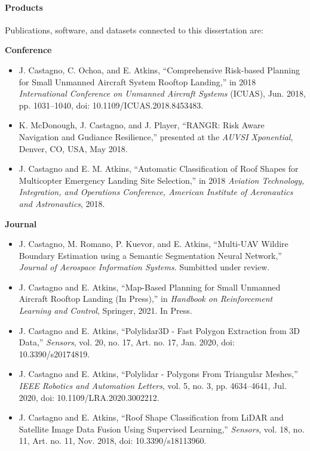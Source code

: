 

\paragraph{Products}
Publications, software, and datasets connected to this dissertation are:
\vspace{0.2cm}

\textbf{Conference}
\vspace{0.20cm}
\begin{itemize}[noitemsep]
    \item J. Castagno, C. Ochoa, and E. Atkins, ``Comprehensive Risk-based Planning for Small Unmanned Aircraft System Rooftop Landing,” in 2018 \emph{International Conference on Unmanned Aircraft Systems} (ICUAS), Jun. 2018, pp. 1031–1040, doi: 10.1109/ICUAS.2018.8453483.
    \item K. McDonough, J. Castagno, and J. Player, ``RANGR: Risk Aware Navigation and Gudiance Resilience,” presented at the \emph{AUVSI Xponential}, Denver, CO, USA, May 2018.
	\item J. Castagno and E. M. Atkins, ``Automatic Classification of Roof Shapes for Multicopter Emergency Landing Site Selection,” in 2018 \emph{Aviation Technology, Integration, and Operations Conference, American Institute of Aeronautics and Astronautics}, 2018.
\end{itemize}

\vspace{0.25cm}

\textbf{Journal}

\vspace{0.20cm}
\begin{itemize}[noitemsep]
    \item J. Castagno, M. Romano, P. Kuevor, and E. Atkins, ``Multi-UAV Wildire Boundary Estimation using a Semantic Segmentation Neural Network,” \emph{Journal of Aerospace Information Systems}. Sumbitted under review.
    \item J. Castagno and E. Atkins, ``Map-Based Planning for Small Unmanned Aircraft Rooftop Landing (In Press),” in \emph{Handbook on Reinforcement Learning and Control}, Springer, 2021. In Press.
    \item J. Castagno and E. Atkins, “Polylidar3D - Fast Polygon Extraction from 3D Data,” \emph{Sensors}, vol. 20, no. 17, Art. no. 17, Jan. 2020, doi: 10.3390/s20174819.
    \item J. Castagno and E. Atkins, “Polylidar - Polygons From Triangular Meshes,” \emph{IEEE Robotics and Automation Letters}, vol. 5, no. 3, pp. 4634–4641, Jul. 2020, doi: 10.1109/LRA.2020.3002212.
    \item J. Castagno and E. Atkins, “Roof Shape Classification from LiDAR and Satellite Image Data Fusion Using Supervised Learning,” \emph{Sensors}, vol. 18, no. 11, Art. no. 11, Nov. 2018, doi: 10.3390/s18113960.
\end{itemize}

